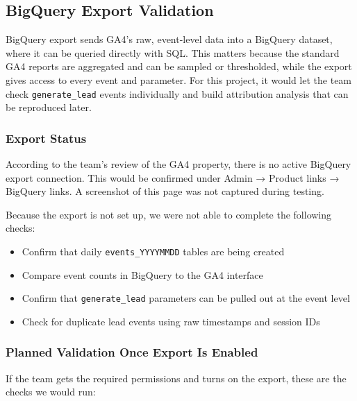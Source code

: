 \documentclass[
  letterpaper,
  DIV=11,
  numbers=noendperiod]{scrartcl}
\providecommand{\tightlist}{%
  \setlength{\itemsep}{0pt}\setlength{\parskip}{0pt}}
\begin{document}
\subsection{BigQuery Export
Validation}\label{bigquery-export-validation}

BigQuery export sends GA4's raw, event-level data into a BigQuery
dataset, where it can be queried directly with SQL. This matters because
the standard GA4 reports are aggregated and can be sampled or
thresholded, while the export gives access to every event and parameter.
For this project, it would let the team check \texttt{generate\_lead}
events individually and build attribution analysis that can be
reproduced later.

\subsubsection{Export Status}\label{export-status}

According to the team's review of the GA4 property, there is no active
BigQuery export connection. This would be confirmed under Admin →
Product links → BigQuery links. A screenshot of this page was not
captured during testing.

Because the export is not set up, we were not able to complete the
following checks:

\begin{itemize}
\tightlist
\item
  Confirm that daily \texttt{events\_YYYYMMDD} tables are being created
\item
  Compare event counts in BigQuery to the GA4 interface
\item
  Confirm that \texttt{generate\_lead} parameters can be pulled out at
  the event level
\item
  Check for duplicate lead events using raw timestamps and session IDs
\end{itemize}

\subsubsection{Planned Validation Once Export Is
Enabled}\label{planned-validation-once-export-is-enabled}

If the team gets the required permissions and turns on the export, these
are the checks we would run:
\end{document}
